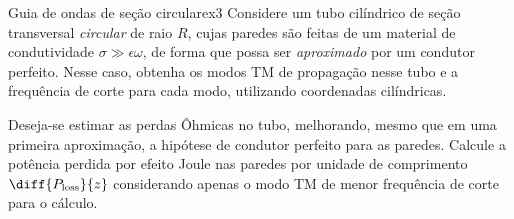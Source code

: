\begin{exercício}{Guia de ondas de seção circular}{ex3}
    Considere um tubo cilíndrico de seção transversal \emph{circular} de raio \(R\), cujas paredes são feitas de um material de condutividade \(\sigma \gg \epsilon \omega\), de forma que possa ser \emph{aproximado} por um condutor perfeito. Nesse caso, obtenha os modos TM de propagação nesse tubo e a frequência de corte para cada modo, utilizando coordenadas cilíndricas.

    Deseja-se estimar as perdas Ôhmicas no tubo, melhorando, mesmo que em uma primeira aproximação, a hipótese de condutor perfeito para as paredes. Calcule a potência perdida por efeito Joule nas paredes por unidade de comprimento \(\diff{P_\mathrm{loss}}{z}\) considerando apenas o modo TM de menor frequência de corte para o cálculo.
\end{exercício}
